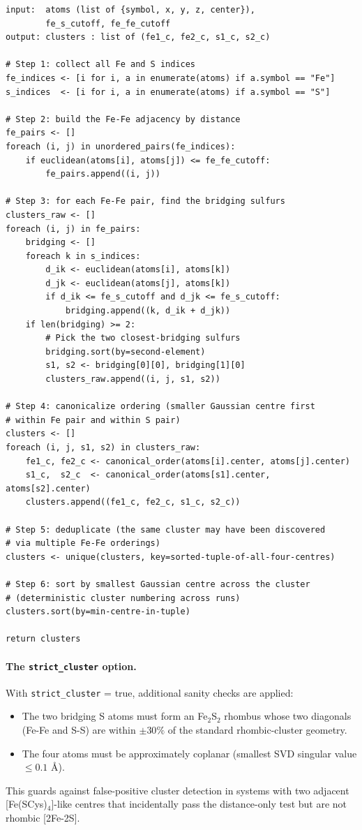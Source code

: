 \documentclass[10pt,a4paper,twoside]{article}
\newcommand{\fn}[1]{\texttt{#1}}
\newcommand{\cfgkey}[1]{\texttt{#1}}
\begin{document}
\begin{lstlisting}[style=pseudo,
  caption={Multi-cluster discovery.
           Implementation: \protect\fn{geometry.find\_all\_clusters}.}]
input:  atoms (list of {symbol, x, y, z, center}),
        fe_s_cutoff, fe_fe_cutoff
output: clusters : list of (fe1_c, fe2_c, s1_c, s2_c)

# Step 1: collect all Fe and S indices
fe_indices <- [i for i, a in enumerate(atoms) if a.symbol == "Fe"]
s_indices  <- [i for i, a in enumerate(atoms) if a.symbol == "S"]

# Step 2: build the Fe-Fe adjacency by distance
fe_pairs <- []
foreach (i, j) in unordered_pairs(fe_indices):
    if euclidean(atoms[i], atoms[j]) <= fe_fe_cutoff:
        fe_pairs.append((i, j))

# Step 3: for each Fe-Fe pair, find the bridging sulfurs
clusters_raw <- []
foreach (i, j) in fe_pairs:
    bridging <- []
    foreach k in s_indices:
        d_ik <- euclidean(atoms[i], atoms[k])
        d_jk <- euclidean(atoms[j], atoms[k])
        if d_ik <= fe_s_cutoff and d_jk <= fe_s_cutoff:
            bridging.append((k, d_ik + d_jk))
    if len(bridging) >= 2:
        # Pick the two closest-bridging sulfurs
        bridging.sort(by=second-element)
        s1, s2 <- bridging[0][0], bridging[1][0]
        clusters_raw.append((i, j, s1, s2))

# Step 4: canonicalize ordering (smaller Gaussian centre first
# within Fe pair and within S pair)
clusters <- []
foreach (i, j, s1, s2) in clusters_raw:
    fe1_c, fe2_c <- canonical_order(atoms[i].center, atoms[j].center)
    s1_c,  s2_c  <- canonical_order(atoms[s1].center, atoms[s2].center)
    clusters.append((fe1_c, fe2_c, s1_c, s2_c))

# Step 5: deduplicate (the same cluster may have been discovered
# via multiple Fe-Fe orderings)
clusters <- unique(clusters, key=sorted-tuple-of-all-four-centres)

# Step 6: sort by smallest Gaussian centre across the cluster
# (deterministic cluster numbering across runs)
clusters.sort(by=min-centre-in-tuple)

return clusters
\end{lstlisting}

\paragraph{The \fn{strict\_cluster} option.}
With \cfgkey{strict\_cluster} = true, additional sanity checks are
applied:
\begin{itemize}
  \item The two bridging S atoms must form an Fe$_2$S$_2$ rhombus
        whose two diagonals (Fe-Fe and S-S) are within $\pm 30\%$
        of the standard rhombic-cluster geometry.
  \item The four atoms must be approximately coplanar
        (smallest SVD singular value $\leq 0.1$ \AA{}).
\end{itemize}
This guards against false-positive cluster detection in systems with
two adjacent [Fe(SCys)$_4$]-like centres that incidentally pass the
distance-only test but are not rhombic [2Fe-2S].
\end{document}
